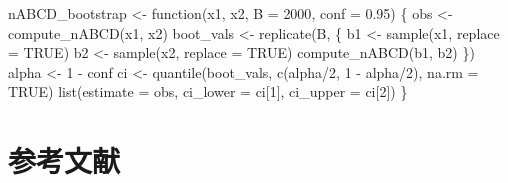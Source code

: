 \documentclass[
  a4paper,
  11pt]{ltjsarticle}
\newenvironment{Shaded}{\begin{snugshade}}{\end{snugshade}}
\newcommand{\AttributeTok}[1]{\textcolor[rgb]{0.40,0.45,0.13}{#1}}
\newcommand{\ConstantTok}[1]{\textcolor[rgb]{0.56,0.35,0.01}{#1}}
\newcommand{\ControlFlowTok}[1]{\textcolor[rgb]{0.00,0.23,0.31}{#1}}
\newcommand{\DecValTok}[1]{\textcolor[rgb]{0.68,0.00,0.00}{#1}}
\newcommand{\FloatTok}[1]{\textcolor[rgb]{0.68,0.00,0.00}{#1}}
\newcommand{\FunctionTok}[1]{\textcolor[rgb]{0.28,0.35,0.67}{#1}}
\newcommand{\NormalTok}[1]{\textcolor[rgb]{0.00,0.23,0.31}{#1}}
\newcommand{\OtherTok}[1]{\textcolor[rgb]{0.00,0.23,0.31}{#1}}
\newcommand{\SpecialCharTok}[1]{\textcolor[rgb]{0.37,0.37,0.37}{#1}}
\begin{document}
\begin{Shaded}
\begin{Highlighting}[]
\NormalTok{nABCD\_bootstrap }\OtherTok{\textless{}{-}} \ControlFlowTok{function}\NormalTok{(x1, x2,}
    \AttributeTok{B =} \DecValTok{2000}\NormalTok{, }\AttributeTok{conf =} \FloatTok{0.95}\NormalTok{) \{}
\NormalTok{  obs }\OtherTok{\textless{}{-}} \FunctionTok{compute\_nABCD}\NormalTok{(x1, x2)}
\NormalTok{  boot\_vals }\OtherTok{\textless{}{-}} \FunctionTok{replicate}\NormalTok{(B, \{}
\NormalTok{    b1 }\OtherTok{\textless{}{-}} \FunctionTok{sample}\NormalTok{(x1, }\AttributeTok{replace =} \ConstantTok{TRUE}\NormalTok{)}
\NormalTok{    b2 }\OtherTok{\textless{}{-}} \FunctionTok{sample}\NormalTok{(x2, }\AttributeTok{replace =} \ConstantTok{TRUE}\NormalTok{)}
    \FunctionTok{compute\_nABCD}\NormalTok{(b1, b2)}
\NormalTok{  \})}
\NormalTok{  alpha }\OtherTok{\textless{}{-}} \DecValTok{1} \SpecialCharTok{{-}}\NormalTok{ conf}
\NormalTok{  ci }\OtherTok{\textless{}{-}} \FunctionTok{quantile}\NormalTok{(boot\_vals,}
    \FunctionTok{c}\NormalTok{(alpha}\SpecialCharTok{/}\DecValTok{2}\NormalTok{, }\DecValTok{1} \SpecialCharTok{{-}}\NormalTok{ alpha}\SpecialCharTok{/}\DecValTok{2}\NormalTok{), }\AttributeTok{na.rm =} \ConstantTok{TRUE}\NormalTok{)}
  \FunctionTok{list}\NormalTok{(}\AttributeTok{estimate =}\NormalTok{ obs,}
       \AttributeTok{ci\_lower =}\NormalTok{ ci[}\DecValTok{1}\NormalTok{], }\AttributeTok{ci\_upper =}\NormalTok{ ci[}\DecValTok{2}\NormalTok{])}
\NormalTok{\}}
\end{Highlighting}
\end{Shaded}

\section*{参考文献}\label{ux53c2ux8003ux6587ux732e}
\end{document}
